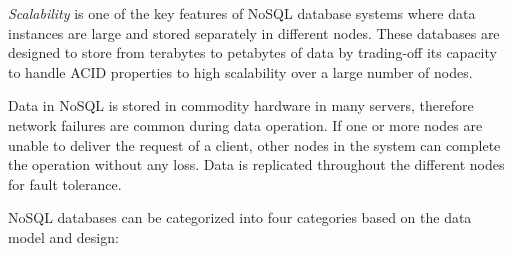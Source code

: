 	\textit{Scalability} is one of the key features of NoSQL database systems where data instances are large and stored separately in different nodes. These databases are designed to store from terabytes to petabytes of data by trading-off its capacity to handle ACID properties to high scalability over a large number of nodes\cite{abramova2013nosql}. 	
   \par  Data in NoSQL is stored in commodity hardware in many servers, therefore network failures are common during data operation. If one or more nodes are unable to deliver the request of a client,  other nodes in the system can complete the operation without any loss. Data is replicated throughout the different nodes for fault tolerance.%
    \par 
NoSQL databases can be categorized into four categories based on the data model and design:
